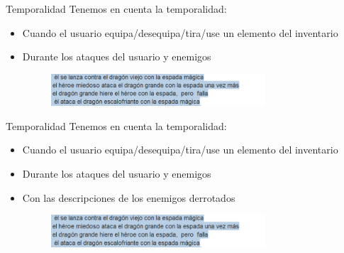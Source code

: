 \begin{frame}[t, fragile]{Temporalidad}
	Tenemos en cuenta la temporalidad:
	\begin{itemize}
		\item Cuando el usuario equipa/desequipa/tira/use un elemento del inventario
		\item<+-| alert@+> Durante los ataques del usuario y enemigos
		\begin{figure}[h]
			\includegraphics[width=8cm]{../img/temporalidadAtaque.PNG}
		\end{figure}
	\end{itemize}
\end{frame}

\begin{frame}[t, fragile]{Temporalidad}
	Tenemos en cuenta la temporalidad:
	\begin{itemize}
		\item Cuando el usuario equipa/desequipa/tira/use un elemento del inventario
		\item Durante los ataques del usuario y enemigos
		\item<+-| alert@+> Con las descripciones de los enemigos derrotados
		\begin{figure}[h]
			\includegraphics[width=8cm]{../img/temporalidadAtaque.PNG}
		\end{figure}
	\end{itemize}
\end{frame}


